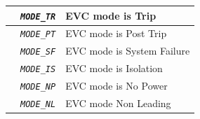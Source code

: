 \documentclass{template/openetcs}
\begin{document}
\begin{itemize}
\begin{longtable}{|l|l|l|}
			\hline

			&	\begin{minipage}[t]{0.40\linewidth} \emph{\texttt{MODE\_TR}} \end{minipage}
			&	\begin{minipage}[t]{0.38\linewidth} EVC mode is Trip \end{minipage} \\ 

			\hline

			&	\begin{minipage}[t]{0.40\linewidth} \emph{\texttt{MODE\_PT}} \end{minipage}
			&	\begin{minipage}[t]{0.38\linewidth} EVC mode is Post Trip \end{minipage} \\ 

			\hline

			&	\begin{minipage}[t]{0.40\linewidth} \emph{\texttt{MODE\_SF}} \end{minipage}
			&	\begin{minipage}[t]{0.38\linewidth} EVC mode is System Failure \end{minipage} \\ 

			\hline

			&	\begin{minipage}[t]{0.40\linewidth} \emph{\texttt{MODE\_IS}} \end{minipage}
			&	\begin{minipage}[t]{0.38\linewidth} EVC mode is Isolation \end{minipage} \\ 

			\hline

			&	\begin{minipage}[t]{0.40\linewidth} \emph{\texttt{MODE\_NP}} \end{minipage}
			&	\begin{minipage}[t]{0.38\linewidth} EVC mode is No Power \end{minipage} \\ 
	
			\hline
	
			&	\begin{minipage}[t]{0.40\linewidth} \emph{\texttt{MODE\_NL}} \end{minipage}
			&	\begin{minipage}[t]{0.38\linewidth} EVC mode Non Leading \end{minipage} \\ 
	

\end{longtable}
\end{itemize}
\end{document}
